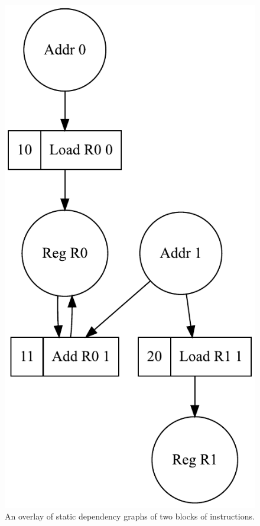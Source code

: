 \begin{figure}
\vspace{-4mm}
\centerline{\includegraphics[scale=0.6]{img/oracle2.pdf}}
\vspace{-3mm}
\caption{An overlay of static dependency graphs of two blocks of instructions.\label{fig-example-graph}}
\vspace{-9mm}
\end{figure}
